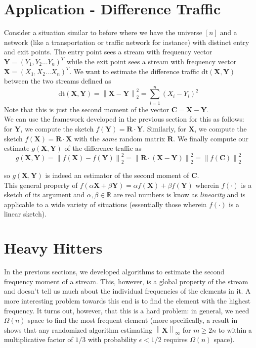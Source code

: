 \documentclass[11pt]{article}
\renewcommand{\vec}[1]{\bm{#1}}
\newcommand{\norm}[1]{\left\lVert#1\right\rVert}
\begin{document}
\section{Application - Difference Traffic}
Consider a situation similar to before where we have the universe $[n]$ and a network (like a transportation or traffic network for instance) with distinct entry and exit points. The entry point sees a stream with frequency vector $\vec{Y} = (Y_1, Y_2 \dots Y_n)^T$ while the exit point sees a stream with frequency vector $\vec{X} = (X_1, X_2 \dots X_n)^T$. We want to estimate the difference traffic $\mathrm{dt}(\vec{X}, \vec{Y})$ between the two streams defined as
\[
	\mathrm{dt}(\vec{X}, \vec{Y}) = \norm{\vec{X} - \vec{Y}}_2^2 = \sum_{i=1}^{n} (X_i - Y_i)^2
\]
\noindent Note that this is just the second moment of the vector $\vec{C} = \vec{X} - \vec{Y}$. \\

\noindent We can use the framework developed in the previous section for this as follows: for $\vec{Y}$, we compute the sketch $f(\vec{Y}) = \vec{R} \cdot \vec{Y}$. Similarly, for $\vec{X}$, we compute the sketch $f(\vec{X}) = \vec{R} \cdot \vec{X}$ with the \textit{same} random matrix $\vec{R}$. We finally compute our estimate $g(\vec{X}, \vec{Y})$ of the difference traffic as 
\[
	g(\vec{X}, \vec{Y}) = \norm{f(\vec{X}) - f(\vec{Y})}_2^2 = \norm{\vec{R}\cdot(\vec{X} - \vec{Y})}_2^2 = \norm{f(\vec{C})}_2^2
\]

\noindent so $g(\vec{X}, \vec{Y})$ is indeed an estimator of the second moment of $\vec{C}$. \\

\noindent This general property of $f(\alpha\vec{X} + \beta \vec{Y}) = \alpha f(\vec{X}) + \beta f(\vec{Y})$ wherein $f(\cdot)$ is a sketch of its argument and $\alpha, \beta \in \mathbb{R}$ are real numbers is know as \textit{linearity} and is applicable to a wide variety of situations (essentially those wherein $f(\cdot)$ is a linear sketch). \\

\section{Heavy Hitters}
In the previous sections, we developed algorithms to estimate the second frequency moment of a stream. This, however, is a global property of the stream and doesn't tell us much about the individual frequencies of the elements in it. A more interesting problem towards this end is to find the element with the highest frequency. It turns out, however, that this is a hard problem: in general, we need $\Omega(n)$ space to find the most frequent element (more specifically, a result in \cite{alon1996space} shows that any randomized algorithm estimating $\norm{\vec{X}}_\infty$ for $m \geq 2n$ to within a multiplicative factor of $1/3$ with probability $\epsilon <1/2$ requires $\Omega(n)$ space). \\
\end{document}
